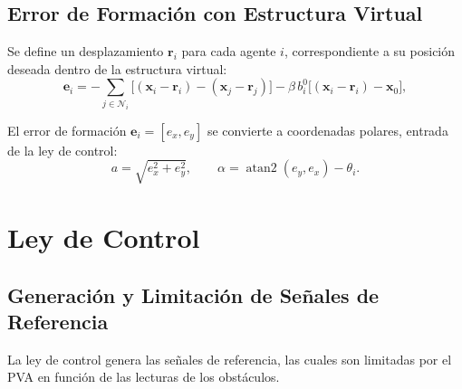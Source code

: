 \subsection{Error de Formación con Estructura Virtual}

Se define un desplazamiento $\mathbf{r}_i$ para cada agente $i$, correspondiente a su posición deseada dentro de la estructura virtual:
\begin{equation*}
    \mathbf{e}_i = -\sum_{j \in \mathcal{N}_i} \big[(\mathbf{x}_i - \mathbf{r}_i) - (\mathbf{x}_j - \mathbf{r}_j)\big] - \beta\, b_i^0\big[(\mathbf{x}_i - \mathbf{r}_i) - \mathbf{x}_0\big],
\end{equation*}

El error de formación $\mathbf{e}_i = [e_x, e_y]$ se convierte a coordenadas polares, entrada de la ley de control:
\begin{equation*}
    a = \sqrt{e_x^2 + e_y^2}, \qquad \alpha = \operatorname{atan2}(e_y, e_x) - \theta_i.
\end{equation*}







\section{Ley de Control}
\subsection{Generación y Limitación de Señales de Referencia}

La ley de control genera las señales de referencia, las cuales son limitadas por el PVA en función de las lecturas de los obstáculos.

